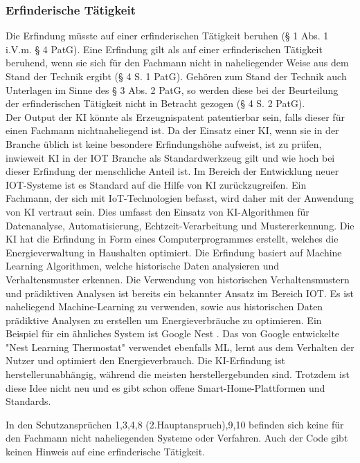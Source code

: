 \subsubsection{Erfinderische Tätigkeit}
Die Erfindung müsste auf einer erfinderischen Tätigkeit beruhen (§ 1 Abs. 1 i.V.m. § 4 PatG).
Eine Erfindung gilt als auf einer erfinderischen Tätigkeit beruhend, wenn sie sich für den Fachmann
nicht in naheliegender Weise aus dem Stand der Technik ergibt (§ 4 S. 1 PatG). Gehören zum Stand
der Technik auch Unterlagen im Sinne des § 3 Abs. 2 PatG, so werden diese bei der Beurteilung der
erfinderischen Tätigkeit nicht in Betracht gezogen (§ 4 S. 2 PatG).
\\
Der Output der KI könnte als Erzeugnispatent patentierbar sein,
falls dieser für einen Fachmann nichtnaheliegend ist.
Da der Einsatz einer KI, wenn sie in der Branche üblich ist keine besondere
Erfindungshöhe aufweist, ist zu prüfen, inwieweit KI in der IOT Branche
als Standardwerkzeug gilt und wie hoch bei dieser Erfindung der menschliche 
Anteil ist. Im Bereich der Entwicklung neuer IOT-Systeme ist es Standard auf
die Hilfe von KI zurückzugreifen. 
Ein Fachmann, der sich mit IoT-Technologien befasst, wird daher mit der Anwendung von KI 
vertraut sein. 
Dies umfasst den Einsatz von KI-Algorithmen für Datenanalyse, 
Automatisierung, Echtzeit-Verarbeitung und Mustererkennung.
Die KI hat die Erfindung in Form eines Computerprogrammes erstellt,
welches die Energieverwaltung in Haushalten optimiert.
Die Erfindung basiert auf Machine Learning Algorithmen, welche
historische Daten analysieren und Verhaltensmuster erkennen.
Die Verwendung von historischen Verhaltensmustern und prädiktiven
Analysen ist bereits ein bekannter Ansatz im Bereich IOT.
Es
ist naheliegend Machine-Learning zu verwenden, 
sowie aus historischen Daten prädiktive Analysen
zu erstellen um 
Energieverbräuche zu optimieren. Ein
Beispiel für ein ähnliches System ist 
Google Nest \cite{YourHelpfulHome}.
Das von Google entwickelte "Nest Learning Thermostat" verwendet
ebenfalls ML, lernt aus dem Verhalten der Nutzer und
optimiert den Energieverbrauch.
Die KI-Erfindung ist herstellerunabhängig, während
die meisten herstellergebunden sind. Trotzdem ist 
diese Idee nicht neu und es gibt schon 
offene Smart-Home-Plattformen und Standards.

In den Schutzansprüchen 1,3,4,8 (2.Hauptanspruch),9,10
befinden sich keine für den Fachmann nicht naheliegenden
Systeme oder Verfahren. Auch der Code gibt keinen
Hinweis auf eine erfinderische Tätigkeit.


